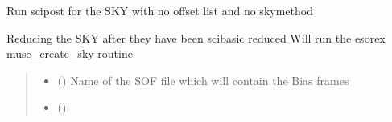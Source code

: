 \documentclass[letterpaper,10pt,english]{sphinxmanual}
\begin{document}
\begin{fulllineitems}
\begin{fulllineitems}
\end{fulllineitems}


\begin{fulllineitems}
\label{\detokenize{api/pymusepipe:pymusepipe.prep_recipes_pipe.PipePrep.run_scipost_sky}}
\pysigstartsignatures
{}
\pysigstopsignatures
\sphinxAtStartPar
Run scipost for the SKY with no offset list and no skymethod

\end{fulllineitems}


\begin{fulllineitems}
\label{\detokenize{api/pymusepipe:pymusepipe.prep_recipes_pipe.PipePrep.run_sky}}
\pysigstartsignatures
{}
\pysigstopsignatures
\sphinxAtStartPar
Reducing the SKY after they have been scibasic reduced
Will run the esorex muse\_create\_sky routine
\begin{quote}\begin{description}
\begin{itemize}
\item {} 
\sphinxAtStartPar
{} (\sphinxstyleliteralemphasis{\sphinxupquote{ (}}\sphinxstyleliteralemphasis{\sphinxupquote{)}}) \textendash{} Name of the SOF file which will contain the Bias frames

\item {} 
\sphinxAtStartPar
{} () \textendash{} 


\end{itemize}
\end{description}
\end{quote}
\end{fulllineitems}
\end{fulllineitems}
\end{document}
